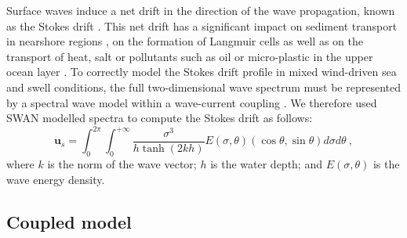 \documentclass[preprint,12pt,authoryear]{elsarticle}
\begin{document}
Surface waves induce a net drift in the direction of the wave propagation, known as the Stokes drift \citep{van2018stokes,stokes1880theory}. This net drift has a significant impact on sediment transport in nearshore regions \citep{hoefel2003wave}, on the formation of Langmuir cells \citep{langmuir1938surface, craik1976rational} as well as on the transport of heat, salt or pollutants such as oil or micro-plastic in the upper ocean layer \citep{mcwilliams2000vertical,rohrs2012observation,drivdal2014wave}. To correctly model the Stokes drift profile in mixed wind-driven sea and swell conditions, the full two-dimensional wave spectrum must be represented by a spectral wave model within a wave-current coupling \citep{van2018stokes}. We therefore used SWAN modelled spectra to compute the Stokes drift as follows:
\begin{equation}
    \mathbf{u}_{s} = \int_0^{2\pi}\int_0^{+\infty} \dfrac{\sigma^3}{h\tanh(2kh)}E(\sigma,\theta)(\cos\theta, \sin\theta)d\sigma d\theta~, \label{eq:stokes}
\end{equation}
where $k$ is the norm of the wave vector; $h$ is the water depth; and $E(\sigma,\theta)$ is the wave energy density.

\subsection{Coupled model}
\end{document}
